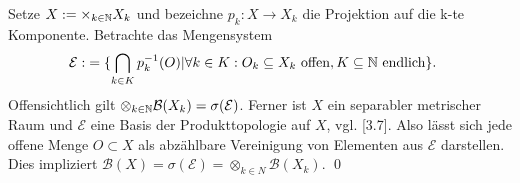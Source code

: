 \begin{proof*}
    Setze $X:= \times_{k \in \mathbb{N}}X_k$ und bezeichne $p_k: X \to X_k$ die Projektion auf die k-te Komponente. Betrachte das Mengensystem
    \begin{align*}
        \mathcal{E} :&= \{ \bigcap_{k \in K}p_k^{-1}(O) | \forall k \in K: O_k \subseteq X_k \text{ offen}, K \subseteq \mathbb{N} \text{ endlich}\}. 
    \end{align*}
    Offensichtlich gilt $\otimes_{k \in \mathbb{N}}\mathcal{B}(X_k) = \sigma(\mathcal{E})$. 
    Ferner ist $X$ ein separabler metrischer Raum und $\mathcal{E}$ eine Basis der Produkttopologie auf $X$, vgl. \cite{querenburg}[3.7]. 
    Also lässt sich jede offene Menge $O \subset X$ als abzählbare Vereinigung von Elementen aus $\mathcal{E}$ darstellen.  
    Dies impliziert $\mathcal{B}(X) = \sigma(\mathcal{E}) = \otimes_{k \in N}\mathcal{B}(X_k)$. \qed
\end{proof*}

